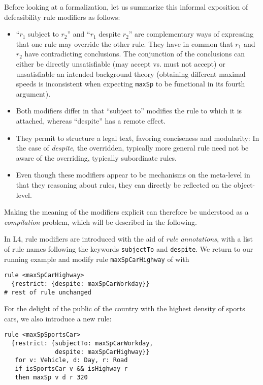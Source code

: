Before looking at a formalization, let us summarize this informal exposition
of defeasibility rule modifiers as follows:
\begin{itemize}
\item ``$r_1$ subject to $r_2$'' and ``$r_1$ despite $r_2$'' are complementary
  ways of expressing that one rule may override the other rule. They have in
  common that $r_1$ and $r_2$ have contradicting conclusions. The conjunction
  of the conclusions can either be directly unsatisfiable (may accept vs.{}
  must not accept) or unsatisfiable \wrt{} an intended background theory
  (obtaining different maximal speeds is inconsistent when expecting
  \texttt{maxSp} to be functional in its fourth argument).
\item Both modifiers differ in that ``subject to'' modifies the rule to which
  it is attached, whereas ``despite'' has a remote effect.
\item They permit to structure a legal text, favoring conciseness and
  modularity: In the case of \emph{despite}, the overridden, typically more
  general rule need not be aware of the overriding, typically subordinate rules.
\item Even though these modifiers appear to be mechanisms on the meta-level in
  that they reasoning about rules, they can directly be reflected on the
  object-level.
\end{itemize}
Making the meaning of the modifiers explicit can therefore be understood as a
\emph{compilation} problem, which will be described in the following.

In L4, rule modifiers are introduced with the aid of \emph{rule annotations}, with a
list of rule names following the keywords \texttt{subjectTo} and
\texttt{despite}. We return to our running example and modify rule
\texttt{maxSpCarHighway} of  with

\begin{lstlisting}
rule <maxSpCarHighway>
  {restrict: {despite: maxSpCarWorkday}}
# rest of rule unchanged
\end{lstlisting}

For the delight of the public of the country with the highest density of
sports cars, we also introduce a new rule:

\begin{lstlisting}
rule <maxSpSportsCar>
  {restrict: {subjectTo: maxSpCarWorkday, 
              despite: maxSpCarHighway}}
   for v: Vehicle, d: Day, r: Road
   if isSportsCar v && isHighway r
   then maxSp v d r 320
 \end{lstlisting}


